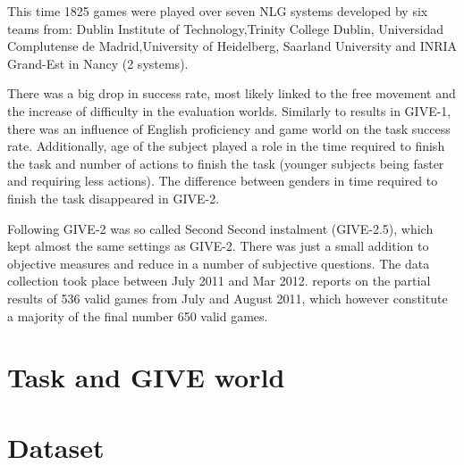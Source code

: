This time 1825 games were played over seven NLG systems developed by six teams from: Dublin Institute of Technology,Trinity College Dublin, Universidad Complutense de Madrid,University of Heidelberg, Saarland University and INRIA Grand-Est in Nancy (2 systems).

There was a big drop in success rate, most likely linked to the free movement and the increase of difficulty in the evaluation worlds. Similarly to results in GIVE-1, there was an influence of English proficiency and game world on the task success rate. Additionally, age of the subject played a role in the time required to finish the task and number of actions to finish the task (younger subjects being faster and requiring less actions). The difference between genders in time required to finish the task disappeared in GIVE-2.

Following GIVE-2 was so called Second Second instalment (GIVE-2.5), which kept almost the same settings as GIVE-2. There was just a small addition to objective measures and reduce in a number of subjective questions. The data collection took place between July 2011 and Mar 2012. \citep{striegnitz2011report} reports on the partial results of 536 valid games from July and August 2011, which however constitute a majority of the final number 650 valid games.
\section{Task and GIVE world}
\label{sec:task-give-world}
\section{Dataset}